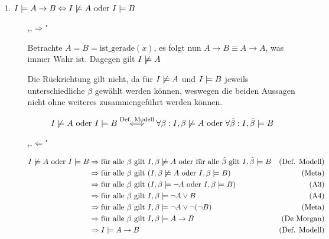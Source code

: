 

\date{Donnerstag 07.11.2019}


\maketitle
\thispagestyle{fancy}


\begin{enumerate}
	\item $I \models A \to B \Leftrightarrow I \not\models A \text{ oder } I \models B$

	\begin{enumerate}
		
		\item[,,$\Rightarrow$"]
		
		Betrachte $A=B=\text{ist\_gerade}(x)$, es folgt nun $A\to B \equiv A\to A$, was immer Wahr ist. Dagegen gilt $I\not\models A$
		
		Die Rückrichtung gilt nicht, da für $I \not\models A $ und $I \models B$ jeweils unterschiedliche $\beta$ gewählt werden können, weswegen die beiden Aussagen nicht ohne weiteres zusammengeführt werden können.
		
		$$ I \not\models A \text{ oder } I \models B \overset{\text{Def. Modell}}{\iff}  \forall \beta : I, \beta \not\models A \text{ oder } \forall \hat{\beta} : I, \hat{\beta} \models B $$
		

		\item[,,$\Leftarrow$"]
		
		\begin{align*}
			I \not\models A \text{ oder } I \models B & \Rightarrow \text{für alle } \beta \text{ gilt } I, \beta \not\models A \text{ oder für alle } \hat{\beta} \text{ gilt } I, \hat{\beta} \models B	& (\text{Def. Modell})\\
			& \Rightarrow \text{für alle } \beta \text{ gilt } (I, \beta \not\models A \text{ oder } I, \beta \models B)  					& (\text{Meta})\\
			& \Rightarrow \text{für alle } \beta \text{ gilt } (I, \beta \models \lnot A \text{ oder } I, \beta \models B ) 	& (\text{A3})\\
			& \Rightarrow \text{für alle } \beta \text{ gilt } I, \beta \models \lnot A \lor B 							& (\text{A4})\\
			& \Rightarrow \text{für alle } \beta \text{ gilt } I, \beta \models \lnot A \lor \lnot(\lnot B) 			& (\text{Meta})\\
			& \Rightarrow \text{für alle } \beta \text{ gilt } I, \beta \models A \to B									& (\text{De Morgan})\\
			& \Rightarrow I \models A \to B													& (\text{Def. Modell})\\
		\end{align*}		
		

\end{enumerate}
\end{enumerate}
